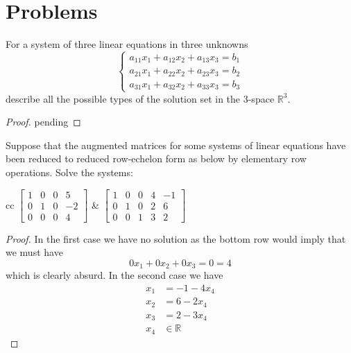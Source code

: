 \section{Problems}

\begin{problem} \label{P.1.1}
     For a system of three linear equations in three unknowns
    \[
    \begin{cases}
    a_{11}x_1 + a_{12}x_2 + a_{13}x_3 = b_1 \\
    a_{21}x_1 + a_{22}x_2 + a_{23}x_3 = b_2 \\
    a_{31}x_1 + a_{32}x_2 + a_{33}x_3 = b_3
    \end{cases}
    \]
    describe all the possible types of the solution set in the 3-space \( \mathbb{R}^3 \).
    
    \begin{proof}
        pending
    \end{proof}
\end{problem}

\begin{problem} \label{P.1.2}
    Suppose that the augmented matrices for some systems of linear equations have been reduced to reduced row-echelon form as below by elementary row operations. Solve the systems:
    \begin{center}
        \begin{tabular}{cc}
            \( \left[ \begin{array}{cccc}
                1 & 0 & 0 & 5 \\
                0 & 1 & 0 & -2 \\
                0 & 0 & 0 & 4
                \end{array} \right] \) & \( \left[ \begin{array}{ccccc}
                1 & 0 & 0 & 4 & -1 \\
                0 & 1 & 0 & 2 & 6 \\
                0 & 0 & 1 & 3 & 2
                \end{array} \right] \) \\
        \end{tabular}
    \end{center}
        
    \begin{proof}
        In the first case we have no solution as the bottom row would imply that we must have
        \[ 0x_1 + 0x_2+0x_3 = 0 = 4 \]
        which is clearly absurd. In the second case we have 
        \begin{align*}
            x_{1} &= -1-4x_4 \\
            x_{2} &= 6-2x_4 \\
            x_3 &= 2-3x_4 \\
            x_4 &\in \mathbb{R}
        \end{align*}
    \end{proof}
\end{problem}

